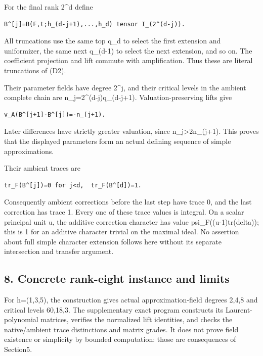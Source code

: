 For the final rank 2\^{}d define

\begin{Verbatim}[fontsize=\small,breaklines=true,breakanywhere=true]
B^[j]=B(F,t;h_(d-j+1),...,h_d) tensor I_(2^(d-j)).
\end{Verbatim}

All truncations use the same top q\_d to select the first extension and
uniformizer, the same next q\_(d-1) to select the next extension, and so
on. The coefficient projection and lift commute with amplification. Thus
these are literal truncations of (D2).

Their parameter fields have degree 2\^{}j, and their critical levels in
the ambient complete chain are n\_j=2\^{}(d-j)q\_(d-j+1).
Valuation-preserving lifts give

\begin{Verbatim}[fontsize=\small,breaklines=true,breakanywhere=true]
v_A(B^[j+1]-B^[j])=-n_(j+1).
\end{Verbatim}

Later differences have strictly greater valuation, since
n\_j\textgreater2n\_(j+1). This proves that the displayed parameters
form an actual defining sequence of simple approximations.

Their ambient traces are

\begin{Verbatim}[fontsize=\small,breaklines=true,breakanywhere=true]
tr_F(B^[j])=0 for j<d,  tr_F(B^[d])=1.
\end{Verbatim}

Consequently ambient corrections before the last step have trace 0, and
the last correction has trace 1. Every one of these trace values is
integral. On a scalar principal unit u, the additive correction
character has value psi\_F((u-1)tr(delta)); this is 1 for an additive
character trivial on the maximal ideal. No assertion about full simple
character extension follows here without its separate intersection and
transfer argument.

\hypertarget{dyadic_tower-concrete-rank-eight-instance-and-limits}{%
\subsection{8. Concrete rank-eight instance and
limits}\label{dyadic_tower-concrete-rank-eight-instance-and-limits}}

For h=(1,3,5), the construction gives actual approximation-field degrees
2,4,8 and critical levels 60,18,3. The supplementary exact program
constructs its Laurent-polynomial matrices, verifies the normalized lift
identities, and checks the native/ambient trace distinctions and matrix
grades. It does not prove field existence or simplicity by bounded
computation: those are consequences of Section5.

